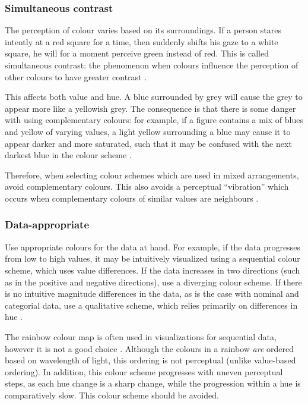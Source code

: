 \documentclass[letterpaper]{report}\usepackage[]{graphicx}\usepackage[]{color}
\begin{document}
\subsubsection{Simultaneous contrast}
The perception of colour varies based on its surroundings. If a person stares intently at a red square for a time, then suddenly shifts his gaze to a white square, he will for a moment perceive green instead of red. This is called simultaneous contrast: the phenomenon when colours influence the perception of other colours to have greater contrast \cite{albers}. 

This affects both value and hue. A blue surrounded by grey will cause the grey to appear more like a yellowish grey. The consequence is that there is some danger with using complementary colours: for example, if a figure contains a mix of blues and yellow of varying values, a light yellow surrounding a blue may cause it to appear darker and more saturated, such that it may be confused with the next darkest blue in the colour scheme \cite{brewers-sim}. 

Therefore, when selecting colour schemes which are used in mixed arrangements, avoid complementary colours. This also avoids a perceptual ``vibration'' which occurs when complementary colours of similar values are neighbours \cite{brewers-sim}.

\subsubsection{Data-appropriate}
Use appropriate colours for the data at hand. For example, if the data progresses from low to high values, it may be intuitively visualized using a sequential colour scheme, which uses value differences. If the data increases in two directions (such as in the positive and negative directions), use a diverging colour scheme. If there is no intuitive magnitude differences in the data, as is the case with nominal and categorial data, use a qualitative scheme, which relies primarily on differences in hue \cite{brewer-colour}.

The rainbow colour map is often used in visualizations for sequential data, however it is not a good choice \cite{rainbow}. Although the colours in a rainbow \textit{are} ordered based on wavelength of light, this ordering is not perceptual (unlike value-based ordering). In addition, this colour scheme progresses with uneven perceptual steps, as each hue change is a sharp change, while the progression within a hue is comparatively slow. This colour scheme should be avoided.
\end{document}
